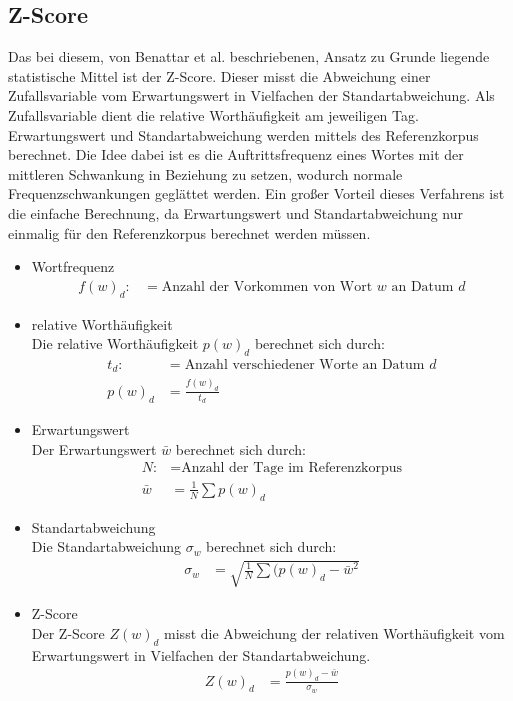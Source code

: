 \subsection{Z-Score}
Das bei diesem, von Benattar et al. \cite{benattar2011trend} beschriebenen, Ansatz zu Grunde liegende statistische Mittel ist der Z-Score. Dieser misst die Abweichung einer Zufallsvariable vom Erwartungswert in Vielfachen der Standartabweichung. Als Zufallsvariable dient die relative Worthäufigkeit am jeweiligen Tag. Erwartungswert und Standartabweichung werden mittels des Referenzkorpus berechnet. Die Idee dabei ist es die Auftrittsfrequenz eines Wortes mit der mittleren Schwankung in Beziehung zu setzen, wodurch normale Frequenzschwankungen geglättet werden. Ein großer Vorteil dieses Verfahrens ist die einfache Berechnung, da Erwartungswert und Standartabweichung nur einmalig für den Referenzkorpus berechnet werden müssen. 

\begin{itemize}
	\item{Wortfrequenz}
		\begin{align*}
			f(w)_d :&= \text{Anzahl der Vorkommen von Wort $w$ an Datum $d$}
		\end{align*}
		
	\item{relative Worthäufigkeit}\\
		Die relative Worthäufigkeit $p(w)_d$ berechnet sich durch:
		\begin{align*}
			t_d   :&= \text{Anzahl verschiedener Worte an Datum $d$} \\
			p(w)_d &= \frac{f(w)_d}{t_d}
		\end{align*}						
		
	\item{Erwartungswert}\\
		Der Erwartungswert $\bar{w}$ berechnet sich durch:
		\begin{align*}
			N      :&= \text{Anzahl der Tage im Referenzkorpus} \\
			\bar{w} &= \frac{1}{N} \sum p(w)_d
		\end{align*}
		
	\item{Standartabweichung}\\
		Die Standartabweichung $\sigma_w$ berechnet sich durch:
		\begin{align*}
			\sigma_w &= \sqrt{\frac{1}{N} \sum (p(w)_d - \bar{w}^2}
		\end{align*}
		
	\item{Z-Score}\\
		Der Z-Score $Z(w)_d$ misst die Abweichung der relativen Worthäufigkeit vom Erwartungswert in Vielfachen der Standartabweichung.
		\begin{align*}
			Z(w)_d &= \frac{p(w)_d - \bar{w}}{\sigma_w}
		\end{align*}
		
\end{itemize}

